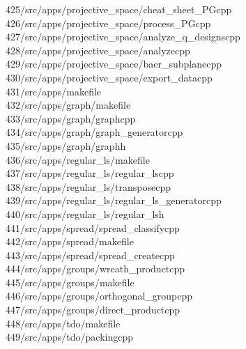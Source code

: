 \begin{tabbing}
425\>/src/apps/projective\_space/cheat\_sheet\_PGcpp\\[0pt]
426\>/src/apps/projective\_space/process\_PGcpp\\[0pt]
427\>/src/apps/projective\_space/analyze\_q\_designscpp\\[0pt]
428\>/src/apps/projective\_space/analyzecpp\\[0pt]
429\>/src/apps/projective\_space/baer\_subplanecpp\\[0pt]
430\>/src/apps/projective\_space/export\_datacpp\\[0pt]
431\>/src/apps/makefile\\[0pt]
432\>/src/apps/graph/makefile\\[0pt]
433\>/src/apps/graph/graphcpp\\[0pt]
434\>/src/apps/graph/graph\_generatorcpp\\[0pt]
435\>/src/apps/graph/graphh\\[0pt]
436\>/src/apps/regular\_ls/makefile\\[0pt]
437\>/src/apps/regular\_ls/regular\_lscpp\\[0pt]
438\>/src/apps/regular\_ls/transposecpp\\[0pt]
439\>/src/apps/regular\_ls/regular\_ls\_generatorcpp\\[0pt]
440\>/src/apps/regular\_ls/regular\_lsh\\[0pt]
441\>/src/apps/spread/spread\_classifycpp\\[0pt]
442\>/src/apps/spread/makefile\\[0pt]
443\>/src/apps/spread/spread\_createcpp\\[0pt]
444\>/src/apps/groups/wreath\_productcpp\\[0pt]
445\>/src/apps/groups/makefile\\[0pt]
446\>/src/apps/groups/orthogonal\_groupcpp\\[0pt]
447\>/src/apps/groups/direct\_productcpp\\[0pt]
448\>/src/apps/tdo/makefile\\[0pt]
449\>/src/apps/tdo/packingcpp\\[0pt]

\end{tabbing}
